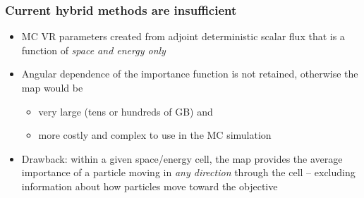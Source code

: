 \documentclass[xcolor=x11names,compress, handout]{beamer}
\renewcommand{\(}{\begin{columns}}
\renewcommand{\)}{\end{columns}}
\newcommand{\<}[1]{\begin{column}{#1}}
\renewcommand{\>}{\end{column}}
\begin{document}
\begin{frame}[fragile]
  \frametitle{Current hybrid methods are insufficient}

	\begin{itemize}
	\item MC VR parameters created from adjoint deterministic scalar flux that is a function of \textit{space and energy only} \vspace*{1 em}
	\item Angular dependence of the importance function is not retained, otherwise the map would be 
	\begin{itemize}
	  \item very large (tens or hundreds of GB) and
	  \item  more costly and complex to use in the MC simulation 
	\end{itemize}
	\item Drawback: within a given space/energy cell, the map provides the average importance of a particle moving in \textit{any direction} through the cell -- excluding information about how particles move \alert{toward the objective}
	\end{itemize}

\end{frame}
\end{document}
